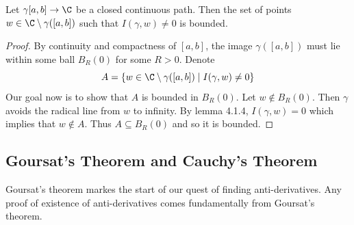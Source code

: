 \documentclass[a4paper]{article}
\begin{document}
\begin{prp}{}{} Let $\gamma[a,b]\to\C$ be a closed continuous path. Then the set of points $w\in\C\setminus\gamma([a,b])$ such that $I(\gamma,w)\neq 0$ is bounded. 
\begin{proof}
By continuity and compactness of $[a,b]$, the image $\gamma([a,b])$ must lie within some ball $B_R(0)$ for some $R>0$. Denote $$A=\{w\in\C\setminus\gamma([a,b])\;|\;I(\gamma,w)\neq 0\}$$ Our goal now is to show that $A$ is bounded in $B_R(0)$. Let $w\notin B_R(0)$. Then $\gamma$ avoids the radical line from $w$ to infinity. By lemma 4.1.4, $I(\gamma,w)=0$ which implies that $w\notin A$. Thus $A\subseteq B_R(0)$ and so it is bounded. 
\end{proof}
\end{prp}

\subsection{Goursat's Theorem and Cauchy's Theorem}
Goursat's theorem markes the start of our quest of finding anti-derivatives. Any proof of existence of anti-derivatives comes fundamentally from Goursat's theorem. 
\end{document}
